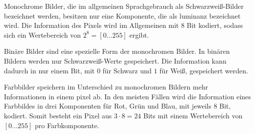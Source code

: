 Monochrome Bilder, die im allgemeinen Sprachgebrauch als Schwarzweiß-Bilder bezeichnet werden, besitzen nur eine
 Komponente, die als \gls{luminanz} bezeichnet wird. Die Information des Pixels wird im Allgemeinen mit 8 Bit kodiert,
 sodass sich ein Wertebereich von $2^8 = \left[0\dotsc255\right]$ ergibt.

Binäre Bilder sind eine spezielle Form der monochromen Bilder. In binären Bildern werden nur Schwarzweiß-Werte
 gespeichert. Die Information kann dadurch in nur einem Bit, mit $0$ für Schwarz und $1$ für Weiß, gespeichert werden.

Farbbilder speichern im Unterschied zu monochromen Bildern mehr Informationen in einem \gls{pixel} ab. In den meisten
 Fällen wird die Information eines Farbbildes in drei Komponenten für Rot, Grün und Blau, mit jeweils 8 Bit, kodiert.
 Somit besteht ein Pixel aus \(3 \cdot 8 = 24\) Bits mit einem Wertebereich von \(\left[0 \dotsc 255\right]\) pro
 Farbkomponente.


